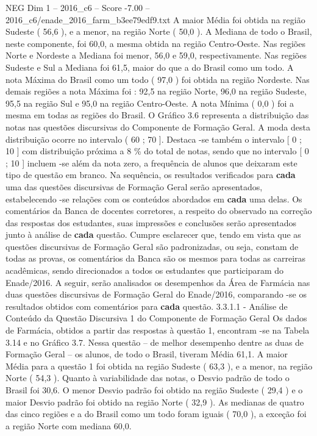 \begin{textsample}{NEG Dim 1 – 2016\_c6 – Score -7.00 – 2016\_c6/enade\_2016\_farm\_b3ee79edf9.txt}
A maior Média foi obtida na região Sudeste ( 56,6 ), e a menor, na região Norte ( 50,0 ).
A Mediana de todo o Brasil, neste componente, foi 60,0, a mesma obtida na região Centro-Oeste.
Nas regiões Norte e Nordeste a Mediana foi menor, 56,0 e 59,0, respectivamente.
Nas regiões Sudeste e Sul a Mediana foi 61,5, maior do que a do Brasil como um todo.
A nota Máxima do Brasil como um todo ( 97,0 ) foi obtida na região Nordeste.
Nas demais regiões a nota Máxima foi : 92,5 na região Norte, 96,0 na região Sudeste, 95,5 na região Sul e 95,0 na região Centro-Oeste.
A nota Mínima ( 0,0 ) foi a mesma em todas as regiões do Brasil.
O Gráfico 3.6 representa a distribuição das notas nas questões discursivas do Componente de Formação Geral.
A moda desta distribuição ocorre no intervalo ( 60 ; 70 ].
Destaca -se também o intervalo [ 0 ; 10 ] com distribuição próxima a 8 \% do total de notas, sendo que no intervalo [ 0 ; 10 ] incluem -se além da nota zero, a frequência de alunos que deixaram este tipo de questão em branco.
Na sequência, os resultados verificados para \textbf{cada} uma das questões discursivas de Formação Geral serão apresentados, estabelecendo -se relações com os conteúdos abordados em \textbf{cada} uma delas.
Os comentários da Banca de docentes corretores, a respeito do observado na correção das respostas dos estudantes, suas impressões e conclusões serão apresentados junto à análise de \textbf{cada} questão.
Cumpre esclarecer que, tendo em vista que as questões discursivas de Formação Geral são padronizadas, ou seja, constam de todas as provas, os comentários da Banca são os mesmos para todas as carreiras acadêmicas, sendo direcionados a todos os estudantes que participaram do Enade/2016.
A seguir, serão analisados os desempenhos da Área de Farmácia nas duas questões discursivas de Formação Geral do Enade/2016, comparando -se os resultados obtidos com comentários para \textbf{cada} questão. 3.3.1.1 - Análise de Conteúdo da Questão Discursiva 1 do Componente de Formação Geral Os dados de Farmácia, obtidos a partir das respostas à questão 1, encontram -se na Tabela 3.14 e no Gráfico 3.7.
Nessa questão – de melhor desempenho dentre as duas de Formação Geral – os alunos, de todo o Brasil, tiveram Média 61,1.
A maior Média para a questão 1 foi obtida na região Sudeste ( 63,3 ), e a menor, na região Norte ( 54,3 ).
Quanto à variabilidade das notas, o Desvio padrão de todo o Brasil foi 30,6.
O menor Desvio padrão foi obtido na região Sudeste ( 29,4 ) e o maior Desvio padrão foi obtido na região Norte ( 32,9 ).
As medianas de quatro das cinco regiões e a do Brasil como um todo foram iguais ( 70,0 ), a exceção foi a região Norte com mediana 60,0.

\end{textsample}
